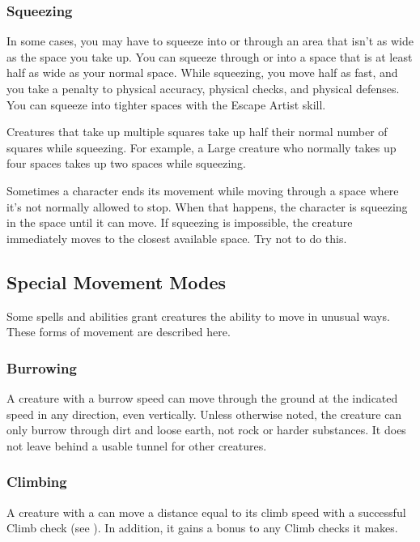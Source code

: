         \subsubsection{Squeezing}\label{Squeezing}

            In some cases, you may have to squeeze into or through an area that isn't as wide as the space you take up. You can squeeze through or into a space that is at least half as wide as your normal space. While squeezing, you move half as fast, and you take a  penalty to physical accuracy, physical checks, and physical defenses. You can squeeze into tighter spaces with the Escape Artist skill.

            Creatures that take up multiple squares take up half their normal number of squares while squeezing. For example, a Large creature who normally takes up four spaces takes up two spaces while squeezing.

             Sometimes a character ends its movement while moving through a space where it's not normally allowed to stop. When that happens, the character is squeezing in the space until it can move. If squeezing is impossible, the creature immediately moves to the closest available space. Try not to do this.

    \subsection{Special Movement Modes}\label{Special Movement Modes}
        Some spells and abilities grant creatures the ability to move in unusual ways. These forms of movement are described here.

        \subsubsection{Burrowing}
            A creature with a burrow speed can move through the ground at the indicated speed in any direction, even vertically. Unless otherwise noted, the creature can only burrow through dirt and loose earth, not rock or harder substances. It does not leave behind a usable tunnel for other creatures.

        \subsubsection{Climbing}
            A creature with a  can move a distance equal to its climb speed with a successful Climb check (see ).
            In addition, it gains a  bonus to any Climb checks it makes.

